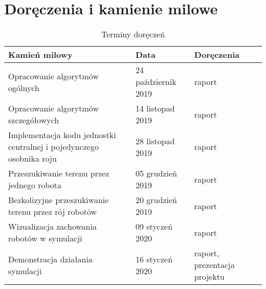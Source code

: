 \section{Doręczenia i kamienie milowe}
\label{sec:doreczenie} %
\begin{table}[h]
\begin{center}
\begin{tabular}{|p{8cm}|l|p{2.5cm}|}
\hline 
Kamień milowy & Data & Doręczenia \\ \hline
Opracowanie algorytmów ogólnych & 24 październik 2019 & raport \\ \hline
Opracowanie algorytmów szczegółowych & 14 listopad 2019 & raport \\ \hline
Implementacja kodu jednostki centralnej i pojedynczego osobnika roju & 28 listopad 2019 & raport \\ \hline
Przeszukiwanie terenu przez jednego robota & 05 grudzień 2019 & raport \\ \hline
Bezkolizyjne przeszukiwanie terenu przez rój robotów & 20 grudzień 2019 & raport \\ \hline
Wizualizacja zachowania robotów w symulacji & 09 styczeń 2020 & raport \\ \hline
Demonstracja działania symulacji & 16 styczeń 2020 & raport, prezentacja projektu \\ \hline
\end{tabular}
\end{center}
\caption{\label{rj}Terminy doręczeń} %
\end{table}